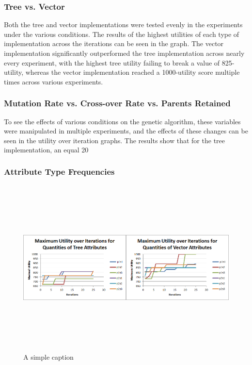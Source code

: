 \documentclass{acm_proc_article-sp}
\begin{document}
    \subsubsection{Tree vs. Vector}

Both the tree and vector implementations were tested evenly in the experiments under the various conditions. The results of the highest utilities of each type of implementation across the iterations can be seen in the graph. The vector implementation significantly outperformed the tree implementation across nearly every experiment, with the highest tree utility failing to break a value of 825-utility, whereas the vector implementation reached a 1000-utility score multiple times across various experiments. 

    \subsubsection{Mutation Rate vs. Cross-over Rate vs. Parents Retained}

To see the effects of various conditions on the genetic algorithm, these variables were manipulated in multiple experiments, and the effects of these changes can be seen in the utility over iteration graphs. The results show that for the tree implementation, an equal 20%

    \subsubsection{Attribute Type Frequencies}

\begin{figure}[ht!]
\centering
\includegraphics[width=\textwidth,height=90mm,keepaspectratio]{./images/attr_frquency_comparison.png}
\caption{A simple caption}
\label{attribute_frequency_experiments}
\end{figure}
\end{document}
